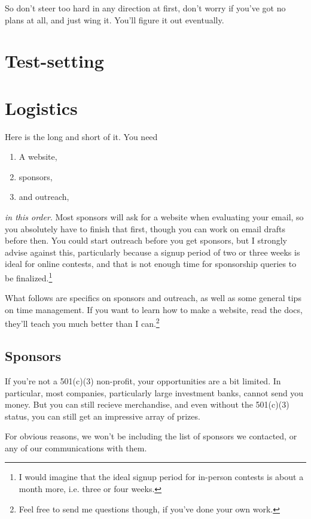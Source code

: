 \documentclass[points=false]{bounce}
\begin{document}
So don't steer too hard in any direction at first,
don't worry if you've got no plans at all,
and just wing it. You'll figure it out eventually.

\section{Test-setting}

\section{Logistics}

Here is the long and short of it. You need
\begin{enumerate}
    \item A website,
    \item sponsors,
    \item and outreach,
\end{enumerate}
\emph{in this order}. Most sponsors will ask for a website when evaluating your email, so you absolutely have to finish that first, though you can work on email drafts before then. You could start outreach before you get sponsors, but I strongly advise against this, particularly because a signup period of two or three weeks is ideal for online contests, and that is not enough time for sponsorship queries to be finalized.\footnote{I would imagine that the ideal signup period for in-person contests is about a month more, i.e. three or four weeks.}

What follows are specifics on sponsors and outreach, as well as some general tips on time management. If you want to learn how to make a website, read the docs, they'll teach you much better than I can.\footnote{Feel free to send me questions though, if you've done your own work.}

\subsection{Sponsors}

If you're not a 501(c)(3) non-profit, your opportunities are a bit limited. In particular, most companies, particularly large investment banks, cannot send you money. But you can still recieve merchandise, and even without the 501(c)(3) status, you can still get an impressive array of prizes.

For obvious reasons, we won't be including the list of sponsors we contacted,
or any of our communications with them.
\end{document}
